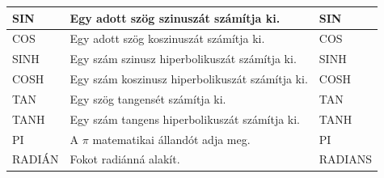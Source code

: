\begin{table}[!h]
\begin{center}
\begin{tabular}{|m{2.5cm}|m{8cm}|m{3cm}|}
SIN & Egy adott szög szinuszát számítja ki. & SIN\\ \hline
COS & Egy adott szög koszinuszát számítja ki. & COS\\ \hline
SINH & Egy szám szinusz hiperbolikuszát számítja ki. & SINH\\ \hline
COSH & Egy szám koszinusz hiperbolikuszát számítja ki. & COSH\\ \hline
TAN & Egy szög tangensét számítja ki. & TAN\\ \hline
TANH & Egy szám tangens  hiperbolikuszát számítja ki. & TANH\\ \hline
PI & A ${\pi}$ matematikai állandót adja meg. & PI\\ \hline
RADIÁN & Fokot radiánná alakít. & RADIANS\\ \hline
\end{tabular}
\end{center}
\end{table}

